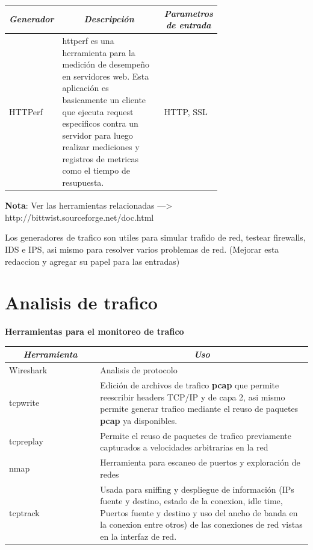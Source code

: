 \documentclass[12pt]{article}
\begin{document}
\begin{table}[htbp]
\centering
\begin{tabular}{|p{0.1\linewidth}|p{0.5\linewidth}|p{0.1\linewidth}|}
\hline
\multicolumn{1}{|c|}{\textit{\textbf{Generador}}} & \multicolumn{1}{c|}{\textit{\textbf{Descripción}}} & \multicolumn{1}{c|}{\textit{\textbf{Parametros de entrada}}} \tabularnewline \hline
HTTPerf & httperf es una herramienta para la medición de desempeño en servidores web. Esta aplicación es basicamente un cliente que ejecuta request especificos contra un servidor para luego realizar mediciones y registros de metricas como el tiempo de resupuesta. & HTTP, SSL \tabularnewline \hline
\end{tabular}
\end{table}






\textbf{Nota}: Ver las herramientas relacionadas ---> http://bittwist.sourceforge.net/doc.html 


\FloatBarrier

Los generadores de trafico son utiles para simular trafido de red, testear firewalls, IDS e IPS, asi mismo para resolver varios problemas de red. (Mejorar esta redaccion y agregar su papel para las entradas)



\section{Analisis de trafico}

\textbf{Herramientas para el monitoreo de trafico}

\begin{table}[htbp]
\centering
\begin{tabular}{|p{0.3\linewidth}|p{0.7\linewidth}|}
\hline
\multicolumn{1}{|c|}{\textit{\textbf{Herramienta}}} & \multicolumn{1}{c|}{\textit{\textbf{Uso}}} \tabularnewline \hline
Wireshark & Analisis de protocolo  \tabularnewline \hline
tcpwrite & Edición de archivos de trafico \textbf{pcap} que permite reescribir headers TCP/IP y de capa 2, asi mismo permite generar trafico mediante el reuso de paquetes \textbf{pcap} ya disponibles. \tabularnewline \hline
tcpreplay &  Permite el reuso de paquetes de trafico previamente capturados a velocidades arbitrarias en la red\tabularnewline \hline
nmap & Herramienta para escaneo de puertos y exploración de redes \tabularnewline \hline
tcptrack & Usada para sniffing y despliegue de información (IPs fuente y destino, estado de la conexion, idle time, Puertos fuente y destino y uso del ancho de banda en la conexion entre otros) de las conexiones de red vistas en la interfaz de red.   \tabularnewline \hline
\end{tabular}
\end{table}
\end{document}
